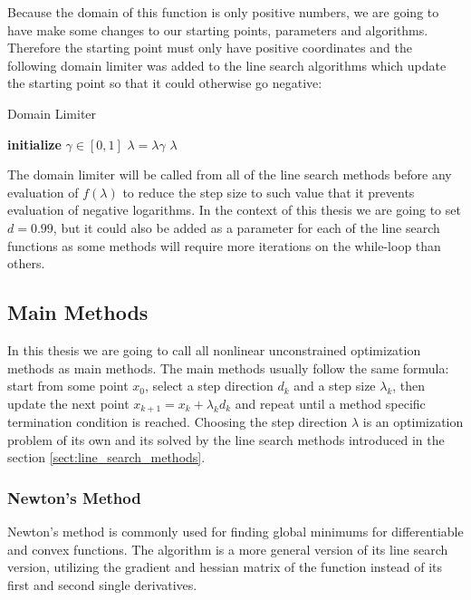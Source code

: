 \documentclass[a4paper,english,titlepage,12pt]{article}
\newcommand{\vect}[1]{\ensuremath{\mathbf{#1}}}
\begin{document}
Because the domain of this function is only positive numbers, we are going to have make some changes to our starting points, parameters and algorithms. Therefore the starting point must only have positive coordinates and the following domain limiter was added to the line search algorithms which update the starting point so that it could otherwise go negative:

\begin{algorithm}[H]
\caption{Domain Limiter}
\label{alg:domain_limiter}
\begin{algorithmic}[1]
\STATE \textbf{initialize} $\gamma \in [0, 1]$
\WHILE{min $(\vect{x} + \lambda \vect{d}) <= 0$}
    \STATE $\lambda = \lambda \gamma$
\ENDWHILE
\RETURN $\lambda$
\end{algorithmic}
\end{algorithm}

The domain limiter will be called from all of the line search methods before any evaluation of $f(\lambda)$ to reduce the step size to such value that it prevents evaluation of negative logarithms. In the context of this thesis we are going to set $d = 0.99$, but it could also be added as a parameter for each of the line search functions as some methods will require more iterations on the while-loop than others.


\subsection{Main Methods}


In this thesis we are going to call all nonlinear unconstrained optimization methods as main methods. The main methods usually follow the same formula: start from some point $x_0$, select a step direction $d_k$ and a step size $\lambda_k$, then update the next point $x_{k + 1} = x_k + \lambda_k d_k$ and repeat until a method specific termination condition is reached. Choosing the step direction $\lambda$ is an optimization problem of its own and its solved by the line search methods introduced in the section \ref{sect:line_search_methods}. \cite{book:nonlinear_programming}


\subsubsection{Newton's Method}


Newton's method is  commonly used for finding global minimums for differentiable and convex functions. The algorithm is a more general version of its line search version, utilizing the gradient and hessian matrix of the function instead of its first and second single derivatives.
\end{document}
